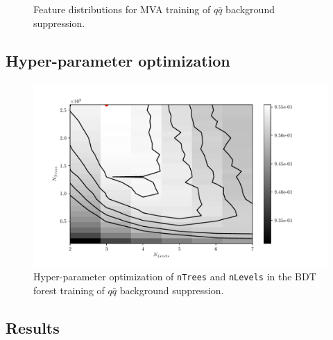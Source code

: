 \begin{figure}[H]
\caption{Feature distributions for MVA training of $q\bar q$ background suppression.}
\end{figure}

\subsection*{Hyper-parameter optimization}

\begin{figure}[H]
\centering
\captionsetup{width=0.8\linewidth}
\includegraphics[width=\linewidth]{fig/addendums/QQ_hpo}
\caption{Hyper-parameter optimization of \texttt{nTrees} and \texttt{nLevels} in the BDT forest training of $q\bar q$ background suppression.}
\end{figure}

\subsection*{Results}

